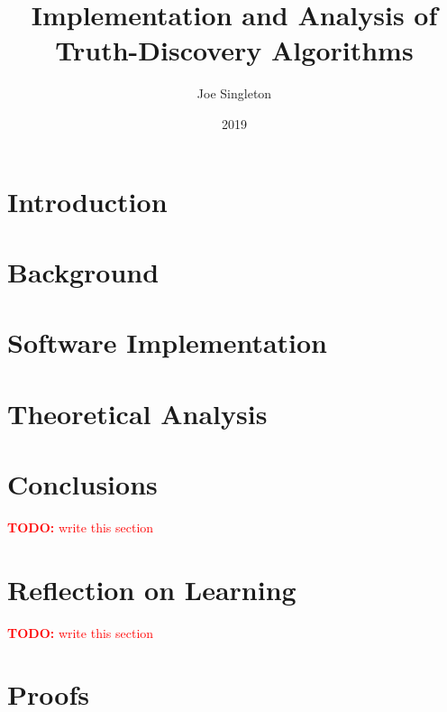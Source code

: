 \documentclass[12pt, oneside]{memoir}
\date{2019}
\author{Joe Singleton}
\title{Implementation and Analysis of Truth-Discovery Algorithms}
\theoremstyle{definition} \newtheorem{definition}{Definition}
\theoremstyle{definition} \newtheorem{example}{Example}
\theoremstyle{plain} \newtheorem{axiom}{Axiom}
\theoremstyle{plain} \newtheorem*{remark}{Remark}
\theoremstyle{remark} \newtheorem*{notation}{Notation}
\theoremstyle{plain} \newtheorem{lemma}{Lemma}
\theoremstyle{plain} \newtheorem{theorem}{Theorem}
\theoremstyle{plain} \newtheorem{proposition}{Proposition}
\newcommand{\todo}[1] {
    \textcolor{red}{
        \textbf{TODO:} #1
    }
}
\begin{document}
\frontmatter
\maketitle

\newpage



\tableofcontents

\mainmatter
\chapter{Introduction}


\chapter{Background}


\chapter{Software Implementation}


\chapter{Theoretical Analysis}


\chapter{Conclusions}
\todo{write this section}
\chapter{Reflection on Learning}
\todo{write this section}

\printbibliography[heading=bibintoc]

\appendix
\chapter{Proofs}
\label{appendix:proofs}

\end{document}
